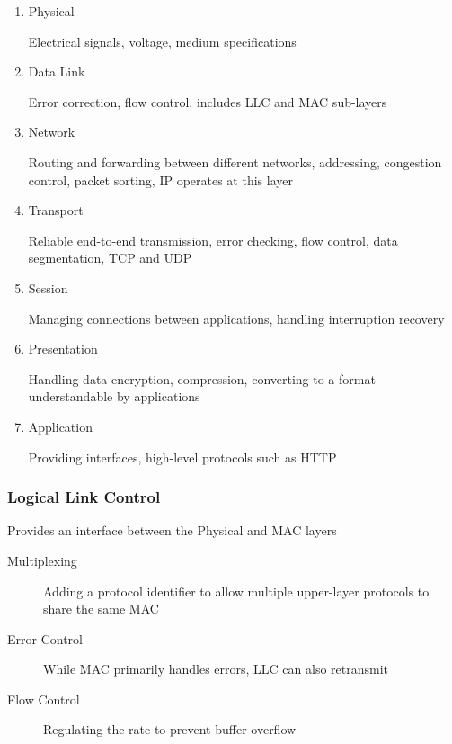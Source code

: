 \documentclass[11pt,journal,compsoc]{IEEEtran}
\begin{document}
\begin{enumerate}
    \item Physical
    
    Electrical signals, voltage, medium specifications
    
    \item Data Link
    
    Error correction, flow control, includes LLC and MAC sub-layers
    
    \item Network
    
    Routing and forwarding between different networks, addressing, congestion control, packet sorting, IP operates at this layer
    
    \item Transport
    
    Reliable end-to-end transmission, error checking, flow control, data segmentation, TCP and UDP
    
    \item Session
    
    Managing connections between applications, handling interruption recovery
    
    \item Presentation
    
    Handling data encryption, compression, converting to a format understandable by applications
    
    \item Application
    
    Providing interfaces, high-level protocols such as HTTP
\end{enumerate}


\subsubsection{Logical Link Control}

Provides an interface between the Physical and MAC layers

\begin{description}
    \item[Multiplexing] Adding a protocol identifier to allow multiple upper-layer protocols to share the same MAC
    
    \item[Error Control] While MAC primarily handles errors, LLC can also retransmit
    
    \item[Flow Control] Regulating the rate to prevent buffer overflow
\end{description}
\end{document}
